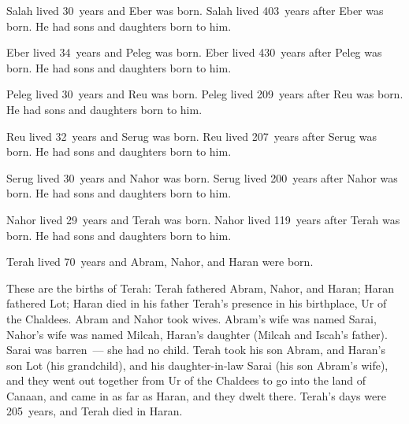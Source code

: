 \begin{inparaenum}
     Salah lived 30~years and Eber was born.%
     Salah lived 403~years after Eber was born. He had sons and daughters born to him.%
    
     Eber lived 34~years and Peleg was born.%
     Eber lived 430~years after Peleg was born. He had sons and daughters born to him.%
    
     Peleg lived 30~years and Reu was born.%
     Peleg lived 209~years after Reu was born. He had sons and daughters born to him.%
    
     Reu lived 32~years and Serug was born.%
     Reu lived 207~years after Serug was born. He had sons and daughters born to him.%
    
     Serug lived 30~years and Nahor was born.%
     Serug lived 200~years after Nahor was born. He had sons and daughters born to him.%
    
     Nahor lived 29~years and Terah was born.%
     Nahor lived 119~years after Terah was born. He had sons and daughters born to him.%
    
     Terah lived 70~years and Abram, Nahor, and Haran were born.%
    
     These are the births of Terah: Terah fathered Abram, Nahor, and Haran; Haran fathered Lot;%
     Haran died in his father Terah's presence in his birthplace, Ur of the Chaldees.%
     Abram and Nahor took wives. Abram's wife was named Sarai, Nahor's wife was named Milcah, Haran's daughter (Milcah and Iscah's father).%
     Sarai was barren~--- she had no child.%
     Terah took his son Abram, and Haran's son Lot (his grandchild), and his daughter-in-law Sarai (his son Abram's wife), and they went out together from Ur of the Chaldees to go into the land of Canaan, and came in as far as Haran, and they dwelt there.%
     Terah's days were 205~years, and Terah died in Haran.%
\end{inparaenum}
